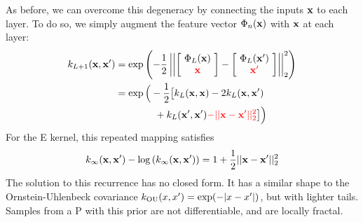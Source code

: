 \documentclass[twoside]{article}
\makeatletter
\newlength{\nonHumbleHeight}
\def\@humbleformat#1{{\settoheight{\nonHumbleHeight}{#1}\resizebox{!}{0.94\nonHumbleHeight}{#1}}}%
\def\humble#1{\@humbleformat{#1}}%
\newcommand{\gp}{{\humble GP}}
\makeatother
\begin{document}
As before, we can overcome this degeneracy by %
connecting the inputs ${\bf{x}}$ to each layer.  To do so, we simply augment the feature vector $\Phi_n({\bf{x}})$ with ${\bf{x}}$ at each layer: 
%
\begin{align}
 k_{L+1}(\vx, \vx') %
& = \exp \left( -\frac{1}{2} \left|\left| \left[ \! \begin{array}{c} \Phi_L(\vx) \\ {\color{red} \vx} \end{array} \! \right]  - \left[ \! \begin{array}{c} \Phi_L(\vx') \\ {\color{red} \vx'} \end{array} \! \right] \right| \right|_2^2 \right) \nonumber \\
& = \exp \Big( -\frac{1}{2} \big[ k_{L}(\vx, \vx) - 2 k_{L}(\vx, \vx') \nonumber \\ 
& \qquad \qquad + k_{L}(\vx', \vx') {\color{red} - || \vx - \vx' ||_2^2} \big] \Big)
\end{align}
%
%
For the {\humble SE} kernel, this repeated mapping satisfies
\begin{align}
k_\infty({\bf{x}}, {\bf{x}}') - \log \left( k_\infty({\bf{x}}, {\bf{x}}') \right) = 1 + \frac{1}{2} || {\bf{x}} - {\bf{x}}' ||_2^2
\end{align}
The solution to this recurrence has no closed form.  It has a similar shape to the Ornstein-Uhlenbeck covariance ${k_{\textnormal{OU}}(x,x') = \exp( -|x - x'| )}$, but with lighter tails.
%
Samples from a \gp{} with this prior are not differentiable, and are locally fractal.%
\end{document}
